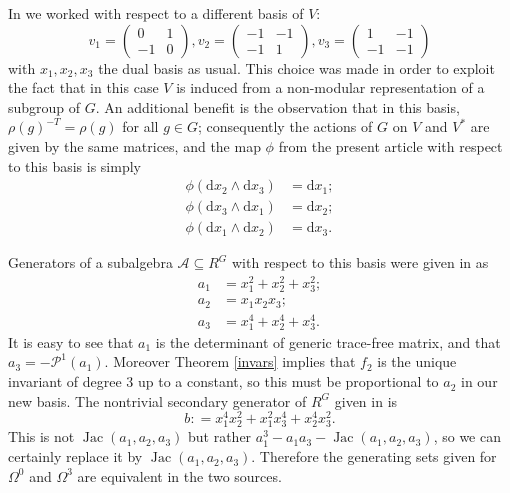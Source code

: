 \documentclass[a4paper]{amsart}
\newcommand{\dd}{\mathrm{d}}
\def\Jac{\operatorname{Jac}}
\newtheorem*{Corollary of Conjecture}{Corollary of Conjecture}
\theoremstyle{definition}
\theoremstyle{remark}
\theoremstyle{Acknowledgments}
\begin{document}
In \cite{ElmerMeyer} we worked with respect to a different basis of $V$:
\[v_1 = \begin{pmatrix} 0 & 1 \\ -1 & 0 \end{pmatrix}, v_2 =  \begin{pmatrix} -1 & -1 \\ -1 & 1 \end{pmatrix}, v_3 =  \begin{pmatrix} 1 & -1 \\ -1 & -1 \end{pmatrix} \] with $x_1,x_2, x_3$ the dual basis as usual. This choice was made in order to exploit the fact that in this case $V$ is induced from a non-modular representation of a subgroup of $G$. An additional benefit is the observation that in this basis, $\rho(g)^{-T}= \rho(g)$ for all $g \in G$; consequently the actions of $G$ on $V$ and $V^*$ are given by the same matrices, and the map $\phi$ from the present article  with respect to this basis is simply 
\begin{align*}
\phi(\dd x_2 \wedge \dd x_3) &=  \dd x_1;\\
\phi(\dd x_3 \wedge \dd x_1) &=  \dd x_2;\\
\phi(\dd x_1 \wedge \dd x_2) &= \dd x_3.
\end{align*}

Generators of a subalgebra $\mathcal{A} \subseteq R^G$ with respect to this basis were given in \cite[Proposition~4]{ElmerMeyer} as
\begin{align*} a_1 &= x_1^2+x_2^2+x_3^2;\\
a_2 &= x_1x_2x_3;\\
a_3 &= x_1^4+x_2^4+x_3^4.
\end{align*}
It is easy to see that $a_1$ is the determinant of generic trace-free matrix, and that $a_3=-\mathcal{P}^1(a_1)$. Moreover Theorem \ref{invars} implies that $f_2$ is the unique invariant of degree 3 up to a constant, so this must be proportional to $a_2$ in our new basis. The nontrivial secondary generator of $R^G$ given in \cite{ElmerMeyer} is
\[b: = x_1^4x_2^2+x_1^2x_3^4+x_2^4x_3^2.\]
This is not $\Jac(a_1,a_2,a_3)$ but rather $a_1^3-a_1a_3-\Jac(a_1,a_2,a_3)$, so we can certainly replace it by $\Jac(a_1,a_2,a_3)$. Therefore the generating sets given for $\Omega^0$ and $\Omega^3$ are equivalent in the two sources.
\end{document}
